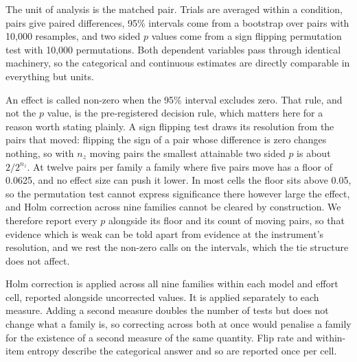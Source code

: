 \label{sec:statanalysis}\label{app:statanalysis}
The unit of analysis is the matched pair. Trials are averaged within a
condition, pairs give paired differences, 95\% intervals come from a
bootstrap over pairs with 10{,}000 resamples, and two sided $p$ values come
from a sign flipping permutation test with 10{,}000 permutations. Both
dependent variables pass through identical machinery, so the categorical and
continuous estimates are directly comparable in everything but units.

An effect is called non-zero when the 95\% interval excludes zero. That rule,
and not the $p$ value, is the pre-registered decision rule, which matters here
for a reason worth stating plainly. A sign flipping test draws its resolution
from the pairs that moved: flipping the sign of a pair whose difference is
zero changes nothing, so with $n_z$ moving pairs the smallest attainable two
sided $p$ is about $2/2^{n_z}$. At twelve pairs per family a family where five
pairs move has a floor of 0.0625, and no effect size can push it lower. In
most cells the floor sits above 0.05, so the permutation test cannot express
significance there however large the effect, and Holm correction across nine
families cannot be cleared by construction. We therefore report every $p$
alongside its floor and its count of moving pairs, so that evidence which is
weak can be told apart from evidence at the instrument's resolution, and we
rest the non-zero calls on the intervals, which the tie structure does not
affect.

Holm correction is applied across all nine families within each
model and effort cell, reported alongside uncorrected values. It is applied
separately to each measure. Adding a second measure doubles the number of
tests but does not change what a family is, so correcting across both at once
would penalise a family for the existence of a second measure of the same
quantity. Flip rate and within-item entropy describe the categorical answer
and so are reported once per cell.

